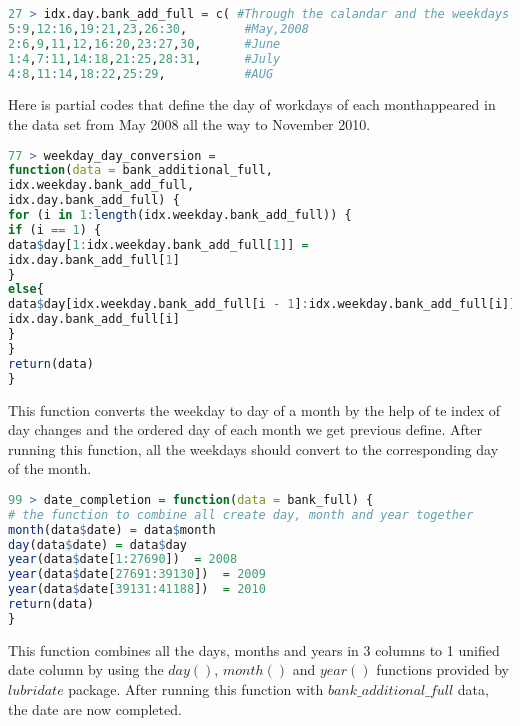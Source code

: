 \documentclass[12pt, a4paper, bibliography=totoc, english]{scrartcl}
\begin{document}
\begin{lstlisting}[language = R]
27 > idx.day.bank_add_full = c( #Through the calandar and the weekdays we will be able to identify the exact day of the month of each row
5:9,12:16,19:21,23,26:30,        #May,2008
2:6,9,11,12,16:20,23:27,30,      #June
1:4,7:11,14:18,21:25,28:31,      #July
4:8,11:14,18:22,25:29,           #AUG
\end{lstlisting}
Here is partial codes that define the day of workdays of each monthappeared in the data set from May 2008 all the way to November 2010.

\begin{lstlisting}[language = R]
77 > weekday_day_conversion =
function(data = bank_additional_full,
idx.weekday.bank_add_full,
idx.day.bank_add_full) {
for (i in 1:length(idx.weekday.bank_add_full)) {
if (i == 1) {
data$day[1:idx.weekday.bank_add_full[1]] =
idx.day.bank_add_full[1]
}
else{
data$day[idx.weekday.bank_add_full[i - 1]:idx.weekday.bank_add_full[i]] =
idx.day.bank_add_full[i]
}
}
return(data)
}
\end{lstlisting}
This function converts the weekday to day of a month by the help of te index of day changes and the ordered day of each month we get previous define. After running this function, all the weekdays should convert to the corresponding day of the month.

\begin{lstlisting}[language = R]
99 > date_completion = function(data = bank_full) {
# the function to combine all create day, month and year together
month(data$date) = data$month
day(data$date) = data$day
year(data$date[1:27690])  = 2008
year(data$date[27691:39130])  = 2009
year(data$date[39131:41188])  = 2010
return(data)
}
\end{lstlisting}
This function combines all the days, months and years in 3 columns to 1 unified date column by using the $day()$, $month()$ and $year()$ functions provided by $lubridate$ package. After running this function with $bank\_additional\_full$ data, the date are now completed.
\end{document}
